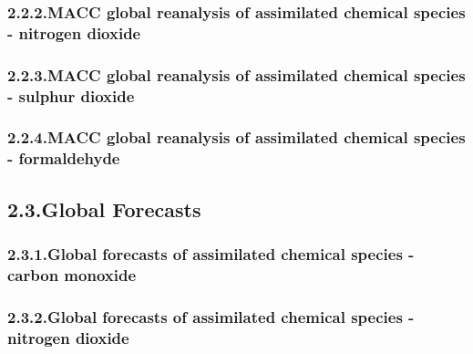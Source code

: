 \documentclass[9pt]{report}
\begin{document}
\subsubsection{2.2.2.\hspace*{0.5em}MACC global reanalysis of assimilated chemical species - nitrogen dioxide}\label{sec-macc-global-reanalysis-of-assimilated-chemical-species---nitrogen-dioxide}%

\subsubsection{2.2.3.\hspace*{0.5em}MACC global reanalysis of assimilated chemical species - sulphur dioxide}\label{sec-macc-global-reanalysis-of-assimilated-chemical-species---sulphur-dioxide}%

\subsubsection{2.2.4.\hspace*{0.5em}MACC global reanalysis of assimilated chemical species - formaldehyde}\label{sec-macc-global-reanalysis-of-assimilated-chemical-species---formaldehyde}%

\subsection{2.3.\hspace*{0.5em}Global Forecasts}\label{sec-global-forecasts}%

\subsubsection{2.3.1.\hspace*{0.5em}Global forecasts of assimilated chemical species - carbon monoxide}\label{sec-global-forecasts-of-assimilated-chemical-species---carbon-monoxide}%

\subsubsection{2.3.2.\hspace*{0.5em}Global forecasts of assimilated chemical species - nitrogen dioxide}\label{sec-global-forecasts-of-assimilated-chemical-species---nitrogen-dioxide}%
\end{document}
